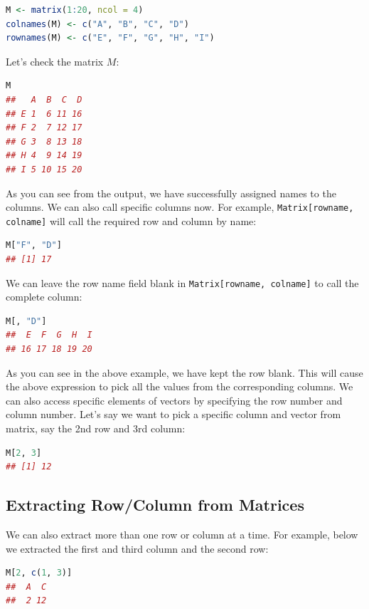 \documentclass[10pt]{book}
\begin{document}
\begin{lstlisting}[language=R]
M <- matrix(1:20, ncol = 4)
colnames(M) <- c("A", "B", "C", "D")
rownames(M) <- c("E", "F", "G", "H", "I")
\end{lstlisting}

Let’s check the matrix \( M \):

\begin{lstlisting}[language=R]
M
##   A  B  C  D
## E 1  6 11 16
## F 2  7 12 17
## G 3  8 13 18
## H 4  9 14 19
## I 5 10 15 20
\end{lstlisting}

As you can see from the output, we have successfully assigned names to the columns. We can also call specific columns now. For example, \texttt{Matrix[rowname, colname]} will call the required row and column by name:

\begin{lstlisting}[language=R]
M["F", "D"]
## [1] 17
\end{lstlisting}

We can leave the row name field blank in \texttt{Matrix[rowname, colname]} to call the complete column:

\begin{lstlisting}[language=R]
M[, "D"]
##  E  F  G  H  I 
## 16 17 18 19 20
\end{lstlisting}

As you can see in the above example, we have kept the row blank. This will cause the above expression to pick all the values from the corresponding columns. We can also access specific elements of vectors by specifying the row number and column number. Let’s say we want to pick a specific column and vector from matrix, say the 2nd row and 3rd column:

\begin{lstlisting}[language=R]
M[2, 3]
## [1] 12
\end{lstlisting}

\subsection{Extracting Row/Column from Matrices}

We can also extract more than one row or column at a time. For example, below we extracted the first and third column and the second row:

\begin{lstlisting}[language=R]
M[2, c(1, 3)]
##  A  C 
##  2 12
\end{lstlisting}
\end{document}
